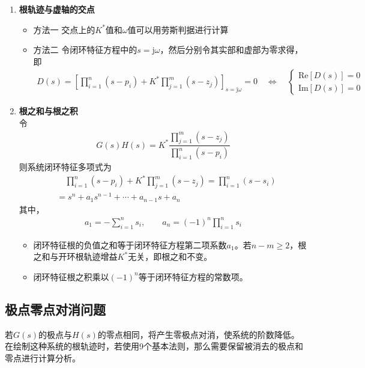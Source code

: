 \begin{enumerate}
	\item \textbf{根轨迹与虚轴的交点}
	\vspace*{-1em}
	\begin{itemize}
		\item 方法一 \quad 交点上的$K^*$值和$\omega$值可以用劳斯判据进行计算
		\item 方法二 \quad 令闭环特征方程中的$s = \text{j}\omega$，然后分别令其实部和虚部为零求得，即
		\begin{align}
			D(s) = \left[\prod_{i = 1}^n (s - p_i) + K^* \prod_{j = 1}^{m}(s - z_j) \right]_{s=\text{j}\omega} = 0 \quad \Longleftrightarrow \quad 
			\begin{cases}
				\text{Re}\left[D(s)\right] = 0\\
				\text{Im}\left[D(s)\right] = 0
			\end{cases}
		\end{align}
	\end{itemize}

	
	\item \textbf{根之和与根之积}\\
	令
	\begin{align*}
		G(s)H(s) = K^* \dfrac{\displaystyle \prod_{j = 1}^m (s - z_j)}{\displaystyle \prod_{i = 1}^n (s - p_i)}
	\end{align*}
	则系统闭环特征多项式为
	\begin{align*}
		&\quad \prod_{i = 1}^n (s - p_i) + K^*\prod_{j = 1}^m (s - z_j) = \prod_{i = 1}^n(s - s_i)\\
		& = s^n + a_1 s^{n-1} + \cdots + a_{n-1}s + a_n
	\end{align*}
	其中，
	\begin{align}
		a_1 = - \sum_{i = 1}^n s_i, \quad \quad a_n = (-1)^n \prod_{i=1}^{n} s_i 
	\end{align}
\begin{itemize}
	\item 闭环特征根的负值之和等于闭环特征方程第二项系数$a_1$。若$n - m \ge 2$，根之和与开环根轨迹增益$K^*$无关，即根之和不变。
	\item 闭环特征根之积乘以$(-1)^n$等于闭环特征方程的常数项。	
\end{itemize}
	
\end{enumerate}

\subsection{极点零点对消问题}
若$G(s)$的极点与$H(s)$的零点相同，将产生零极点对消，使系统的阶数降低。在绘制这种系统的根轨迹时，若使用9个基本法则，那么需要保留被消去的极点和零点进行计算分析。

